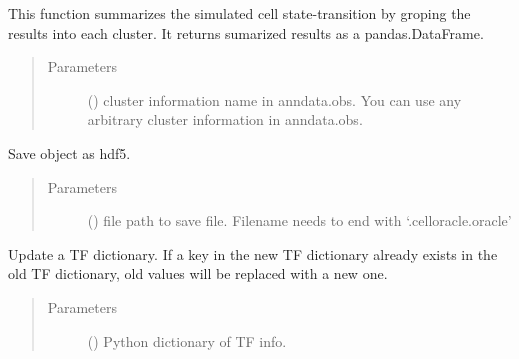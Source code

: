 \documentclass[letterpaper,10pt,english]{sphinxmanual}
\begin{document}
\begin{fulllineitems}
\begin{fulllineitems}
\label{\detokenize{modules/celloracle:celloracle.Oracle.summarize_mc_results_by_cluster}}
This function summarizes the simulated cell state-transition by groping the results into each cluster.
It returns sumarized results as a pandas.DataFrame.
\begin{quote}\begin{description}
\item[{Parameters}] \leavevmode
{} () \textendash{} cluster information name in anndata.obs.
You can use any arbitrary cluster information in anndata.obs.

\end{description}\end{quote}

\end{fulllineitems}


\begin{fulllineitems}
\label{\detokenize{modules/celloracle:celloracle.Oracle.to_hdf5}}
Save object as hdf5.
\begin{quote}\begin{description}
\item[{Parameters}] \leavevmode
{} () \textendash{} file path to save file. Filename needs to end with ‘.celloracle.oracle’

\end{description}\end{quote}

\end{fulllineitems}


\begin{fulllineitems}
\label{\detokenize{modules/celloracle:celloracle.Oracle.updateTFinfo_dictionary}}
Update a TF dictionary.
If a key in the new TF dictionary already exists in the old TF dictionary, old values will be replaced with a new one.
\begin{quote}\begin{description}
\item[{Parameters}] \leavevmode
{} () \textendash{} Python dictionary of TF info.


\end{description}
\end{quote}
\end{fulllineitems}
\end{fulllineitems}
\end{document}
